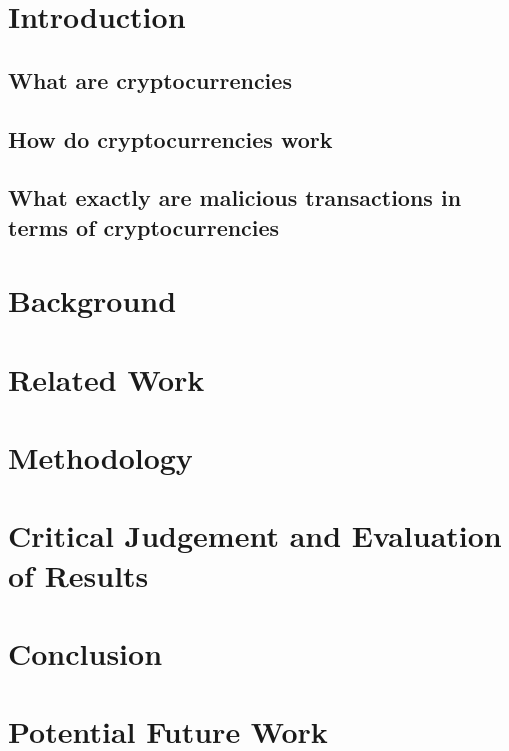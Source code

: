 \documentclass{article}
\begin{document}
\section{Introduction}
\subsection{What are cryptocurrencies}
\subsection{How do cryptocurrencies work}
\subsection{What exactly are malicious transactions in terms of cryptocurrencies}
\pagebreak
\section{Background}
\pagebreak
\section{Related Work}
\pagebreak
\section{Methodology}
\pagebreak
\section{Critical Judgement and Evaluation of Results}
\pagebreak
\section{Conclusion}
\pagebreak
\section{Potential Future Work}
\pagebreak
\end{document}

